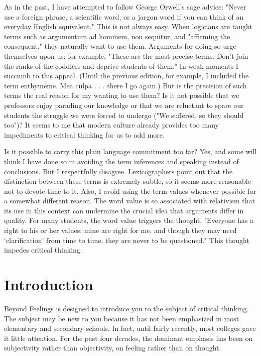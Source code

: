 \documentclass{book}
\begin{document}
As in the past, I have attempted to follow George Orwell’s sage advice: "Never use a foreign phrase, a scientific word, or a jargon word if you can think of an everyday English equivalent." This is not always easy. When logicians are taught terms such as argumentum ad hominem, non sequitur, and "affirming the consequent," they naturally want to use them. Arguments for doing so urge themselves upon us: for example, "These are the most precise terms. Don’t join the ranks of the coddlers and deprive students of them." In weak moments I succumb to this appeal. (Until the previous edition, for example, I included the term enthymeme. Mea culpa . . . there I go again.) But is the precision of such terms the real reason for my wanting to use them? Is it not possible that we professors enjoy parading our knowledge or that we are reluctant to spare our students the struggle we were forced to undergo ("We suffered, so they should too")? It seems to me that modern culture already provides too many impediments to critical thinking for us to add more.

Is it possible to carry this plain language commitment too far? Yes, and some will think I have done so in avoiding the term inferences and speaking instead of conclusions. But I respectfully disagree. Lexicographers point out that the distinction between these terms is extremely subtle, so it seems more reasonable not to devote time to it. Also, I avoid using the term values whenever possible for a somewhat different reason. The word value is so associated with relativism that its use in this context can undermine the crucial idea that arguments differ in quality. For many students, the word value triggers the thought, "Everyone has a right to his or her values; mine are right for me, and though they may need ‘clarification’ from time to time, they are never to be questioned." This thought impedes critical thinking.

\chapter{Introduction}

Beyond Feelings is designed to introduce you to the subject of critical thinking. The subject may be new to you because it has not been emphasized in most elementary and secondary schools. In fact, until fairly recently, most colleges gave it little attention. For the past four decades, the dominant emphasis has been on subjectivity rather than objectivity, on feeling rather than on thought.
\end{document}
